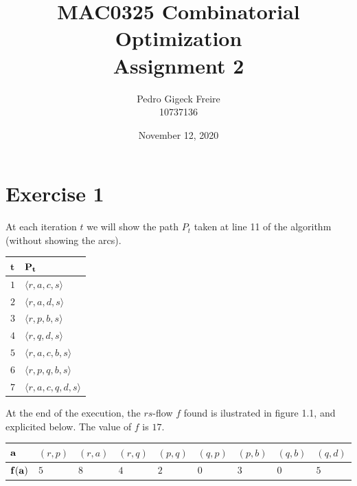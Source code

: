 \documentclass[a4paper,10pt, leqno]{article}
\title{MAC0325 Combinatorial Optimization \\
        \large Assignment 2 }
\author{Pedro Gigeck Freire \\
        10737136}
\date{November 12, 2020}
\theoremstyle{definition}
\begin{document}
\maketitle


\section*{Exercise 1}
At each iteration $t$ we will show the path $P_t$ taken at line 11 of the algorithm (without showing the arcs).

\bgroup
\def\arraystretch{1.8}
\begin{center}
\begin{tabular}{|m{0.4cm}|m{3cm}|}
\hline 
\centering $\bm{t}$ & \centering\arraybackslash $\bf{P_t}$ \\ 
\hline 
\centering $1$ & \centering\arraybackslash $\langle r, a, c, s \rangle$ \\
\hline 
\centering $2$ & \centering\arraybackslash $\langle r, a, d, s \rangle$ \\
\hline 
\centering $3$ & \centering\arraybackslash $\langle r, p, b, s \rangle$ \\
\hline 
\centering $4$ & \centering\arraybackslash $\langle r, q, d, s \rangle$ \\
\hline 
\centering $5$ & \centering\arraybackslash $\langle r, a, c, b, s \rangle$ \\
\hline
\centering $6$ & \centering\arraybackslash $\langle r, p, q, b, s \rangle$ \\
\hline
\centering $7$ & \centering\arraybackslash $\langle r, a, c, q, d, s \rangle$ \\
\hline
\end{tabular}
\end{center}
\egroup

At the end of the execution, the $rs$-flow $f$ found is ilustrated in figure 1.1, and explicited below. The value of $f$ is $17$.

\bgroup
\def\arraystretch{1.8}
\begin{center}
\begin{tabular}{|m{0.8cm}|m{0.8cm}|m{0.8cm}|m{0.8cm}|m{0.8cm}|m{0.8cm}|m{0.8cm}|m{0.8cm}|m{0.8cm}|}
\hline 
\centering $\bf{a}$ 
& $(r, p)$
& $(r, a)$
& $(r, q)$
& $(p, q)$
& $(q, p)$
& $(p, b)$
& $(q, b)$
& $(q, d)$
\\ \hline
$\bf{f(a)}$ 
& \centering $5$
& \centering $8$
& \centering $4$
& \centering $2$
& \centering $0$
& \centering $3$
& \centering $0$
& \centering\arraybackslash $5$
\\ \hline
\end{tabular}
\end{center}
\egroup
\end{document}
